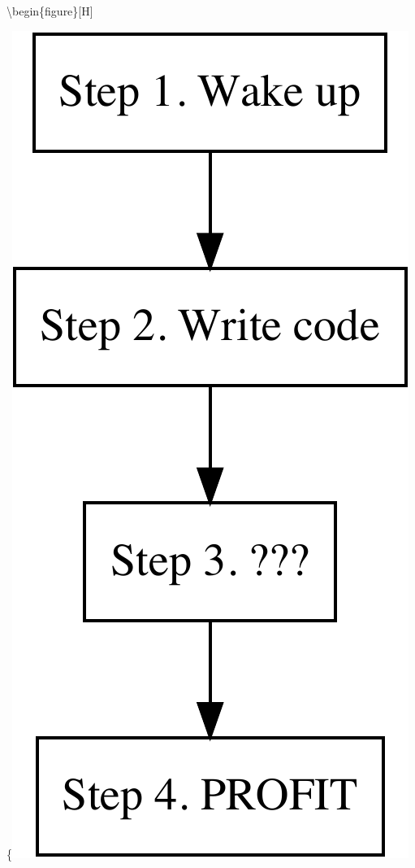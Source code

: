 \documentclass[
]{book}
\begin{document}
\textbackslash begin\{figure\}{[}H{]}

\{\centering \includegraphics[width=0.5\linewidth]{chunk-img/test-1}

  
\end{document}
